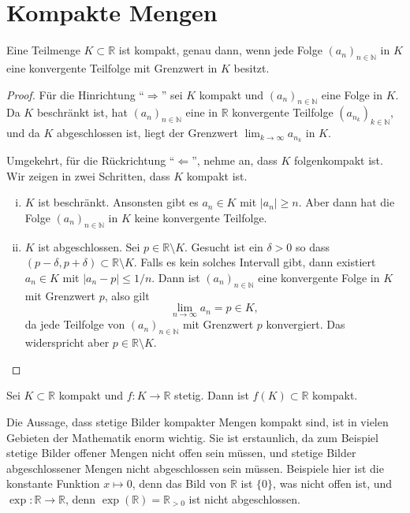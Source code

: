 \documentclass[../main.tex]{subfiles}
\begin{document}
\section{Kompakte Mengen}
\begin{proposition}[Folgenkompaktheit]
  Eine Teilmenge $K \subset \mathbb{R}$ ist
  kompakt, genau dann, wenn jede Folge
  ${(a_{n})}_{n \in \mathbb{N}}$ in $K$
  eine konvergente Teilfolge mit Grenzwert
  in $K$ besitzt.
\end{proposition}

\begin{proof}
  Für die Hinrichtung ``$\Rightarrow$''
  sei $K$ kompakt und ${(a_{n})}_{n \in \mathbb{N}}$
  eine Folge
  in $K$.
  Da $K$ beschränkt ist, hat ${(a_{n})}_{n \in \mathbb{N}}$ 
  eine in $\mathbb{R}$ konvergente
  Teilfolge  ${(a_{n_{k}})}_{k \in \mathbb{N}}$, und
  da $K$ abgeschlossen ist, liegt
  der Grenzwert $\lim_{k \to \infty} a_{n_k}$ in $K$.

  Umgekehrt, für die Rückrichtung ``$\Leftarrow$'',
  nehme an, dass $K$ folgenkompakt ist.
  Wir zeigen in zwei Schritten, dass
  $K$ kompakt ist.
  \begin{enumerate}[(i)]
    \item $K$ ist beschränkt.
      Ansonsten gibt es $a_n \in K$
      mit $|a_{n}| \geq n$.
      Aber dann hat die Folge
      ${(a_{n})}_{n \in \mathbb{N}}$ 
      in $K$ keine konvergente Teilfolge.
    \item $K$ ist abgeschlossen.
      Sei $p \in \mathbb{R} \setminus K$.
      Gesucht ist ein $\delta > 0$ 
      so dass
      $(p - \delta, p + \delta) \subset \mathbb{R} \setminus K$.
      Falls es kein solches Intervall gibt,
      dann existiert $a_n \in K$ mit
      $|a_n - p| \leq 1/n$.
      Dann ist ${(a_{n})}_{n \in \mathbb{N}}$ eine
      konvergente Folge in $K$ mit Grenzwert $p$, also gilt
      \[
        \lim_{n \to \infty} a_n = p \in K,
      \]
      da jede Teilfolge von ${(a_{n})}_{n \in \mathbb{N}}$ 
      mit Grenzwert $p$ konvergiert. Das widerspricht
      aber $p \in \mathbb{R} \setminus K$. \qedhere
  \end{enumerate}
\end{proof}

\begin{proposition}\label{prop:image-compact-compact}
  Sei $K \subset \mathbb{R}$ kompakt und
  $f \colon K \to \mathbb{R}$ stetig.
  Dann ist $f(K) \subset \mathbb{R}$ kompakt.
\end{proposition}

\begin{remark}
  Die Aussage, dass stetige Bilder kompakter Mengen
  kompakt sind, ist in vielen Gebieten der Mathematik
  enorm
  wichtig. Sie ist erstaunlich, da
  zum Beispiel stetige Bilder offener Mengen
  nicht offen sein müssen,
  und stetige Bilder abgeschlossener Mengen
  nicht abgeschlossen sein müssen.
  Beispiele hier ist die konstante Funktion
  $x \mapsto 0$,
  denn das Bild von $\mathbb{R}$ ist $\{0\}$,
  was nicht offen ist,
  und $\exp \colon \mathbb{R} \to \mathbb{R}$,
  denn $\exp( \mathbb{R} ) = \mathbb{R}_{>0}$
  ist nicht abgeschlossen.
\end{remark}
\end{document}

